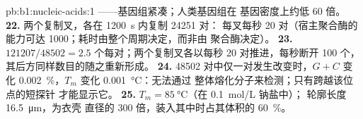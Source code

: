 \begin{solution}{pb:b1:nucleic-acids:1}
——基因组紧凑；人类基因组在
基因密度上约低 60 倍。
\textbf{22.} 两个复制叉，各在 \qty{1200}{s} 内复制 \num{24251} 对：
每叉每秒 \qty{20}{} 对（宿主聚合酶的能力可达
\qty{1000}{}；耗时由整个周期决定，而非由
聚合酶决定）。
\textbf{23.} $\num{121207}/\num{48502} = 2.5$ 个每对；两个复制叉各以每秒 20 对推进，每秒断开 100 个，其后方同样数目的随之重新形成。
\textbf{24.} \num{48502} 对中仅一对发生改变时，$G + C$ 变化
\qty{0.002}{\%}，$T_m$ 变化 \qty{0.001}{\celsius}：无法通过
整体熔化分子来检测；只有跨越该位点的短探针
才能显示它。
\textbf{25.} $T_m = \qty{85}{\celsius}$（在 \qty{0.1}{mol/L} 钠盐中）；
轮廓长度 \qty{16.5}{\micro m}，为衣壳
直径的 300 倍，装入其中时占其体积的 \qty{60}{\%}。
\end{solution}
